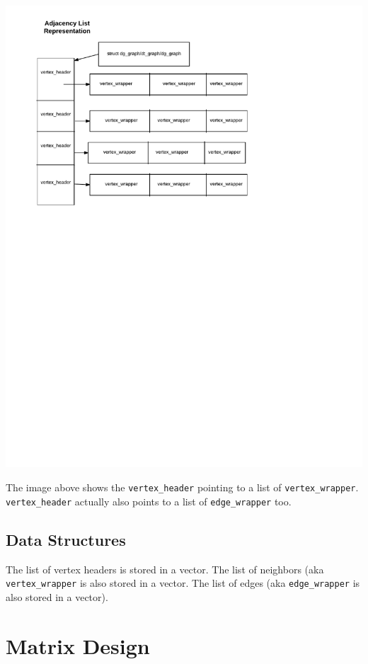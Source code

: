 \documentclass{article}
\begin{document}
\includegraphics{al}

The image above shows the \texttt{vertex\_header} pointing to a list of \texttt{vertex\_wrapper}. \texttt{vertex\_header} actually also points to a list of \texttt{edge\_wrapper} too. 
\subsection{Data Structures}
The list of vertex headers is stored in a vector. The list of neighbors (aka \texttt{vertex\_wrapper} is also stored in a vector. The list of edges (aka \texttt{edge\_wrapper} is also stored in a vector).

\section{Matrix Design}
\end{document}
